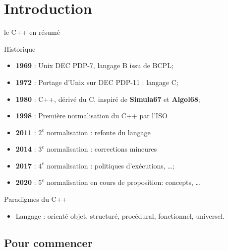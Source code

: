 \documentclass[handout,10pt]{beamer}
\begin{document}
\section{Introduction}

\begin{frame}[fragile]{le C++ en résumé}
\tiny
\begin{block}{Historique}
\begin{itemize}
  \item \textbf{1969} : Unix DEC PDP-7, langage B issu de BCPL;
  \item \textbf{1972} : Portage d'Unix sur DEC PDP-11 : langage C;
  \item \textbf{1980} :  C++, dérivé du C, inspiré de \textbf{Simula67} et \textbf{Algol68};
  \item \textbf{1998} : Première normalisation du C++ par l'ISO
  \item \textbf{2011} : $2^{e}$ normalisation  : refonte du langage
  \item \textbf{2014} : $3^{e}$ normalisation  : corrections mineures
  \item \textbf{2017} : $4^{e}$ normalisation  : politiques d'exécutions, \ldots;
  \item \textbf{2020} : $5^{e}$ normalisation en cours de proposition: concepts, \ldots
\end{itemize}
\end{block}

\begin{block}{Paradigmes du C++}
\begin{itemize}
 \item Langage : orienté objet, structuré, procédural, fonctionnel, universel.
\end{itemize}
\end{block}
\end{frame}

\subsection{Pour commencer}
\end{document}

